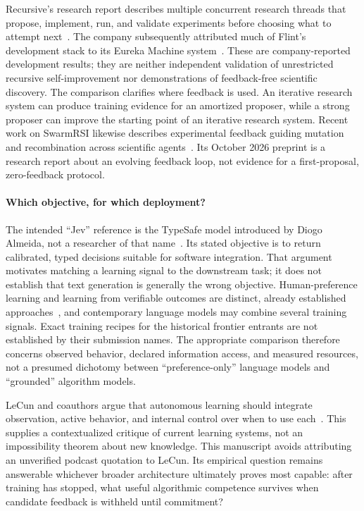 Recursive's research report describes multiple concurrent research threads
that propose, implement, run, and validate experiments before choosing what
to attempt next~\cite{recursiveresearch}. The company subsequently attributed
much of Flint's development stack to its Eureka Machine
system~\cite{recursiveflint}. These are company-reported development results;
they are neither independent validation of unrestricted recursive
self-improvement nor demonstrations of feedback-free scientific discovery.
The comparison clarifies where feedback is used. An iterative research system
can produce training evidence for an amortized proposer, while a strong
proposer can improve the starting point of an iterative research system.
Recent work on SwarmRSI likewise describes experimental feedback guiding
mutation and recombination across scientific agents~\cite{swarmrsi}. Its
October 2026 preprint is a research report about an evolving feedback loop,
not evidence for a first-proposal, zero-feedback protocol.

\paragraph{Which objective, for which deployment?}
The intended ``Jev'' reference is the TypeSafe model introduced by Diogo
Almeida, not a researcher of that name~\cite{jev}. Its stated objective is to
return calibrated, typed decisions suitable for software integration. That
argument motivates matching a learning signal to the downstream task; it
does not establish that text generation is generally the wrong objective.
Human-preference learning and learning from verifiable outcomes are distinct,
already established approaches~\cite{rlhf,rlvr}, and contemporary language
models may combine several training signals. Exact training recipes for the
historical frontier entrants are not established by their submission names.
The appropriate comparison therefore concerns observed behavior, declared
information access, and measured resources, not a presumed dichotomy between
``preference-only'' language models and ``grounded'' algorithm models.

LeCun and coauthors argue that autonomous learning should integrate observation,
active behavior, and internal control over when to use each~\cite{lecun}.
This supplies a contextualized critique of current learning systems, not an
impossibility theorem about new knowledge. This manuscript avoids attributing
an unverified podcast quotation to LeCun. Its empirical question remains
answerable whichever broader architecture ultimately proves most capable:
after training has stopped, what useful algorithmic competence survives when
candidate feedback is withheld until commitment?
